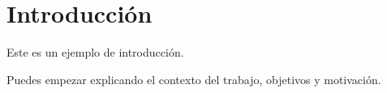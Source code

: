 \chapter{Introducción}

Este es un ejemplo de introducción.

Puedes empezar explicando el contexto del trabajo, objetivos y motivación.